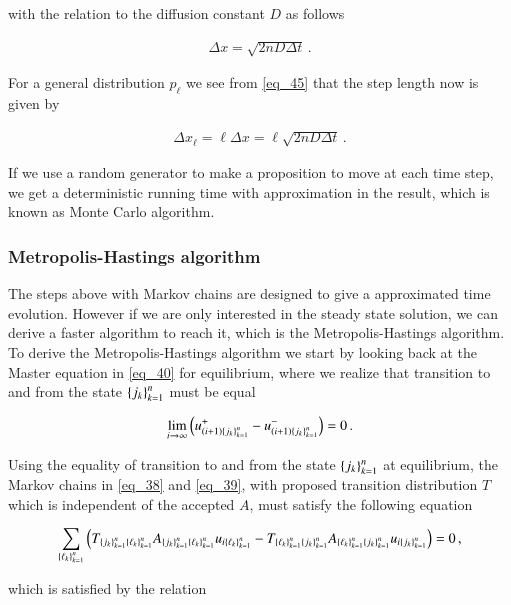 \documentclass[11pt,english,a4paper]{article}
\begin{document}
\begin{flushleft}
with the relation to the diffusion constant $D$ as follows

\begin{align}
\Delta x = \sqrt{2nD\Delta t}\,. 
\label{eq_46}
\end{align}

For a general distribution $p_\ell$ we see from \eqref{eq_45} that the step length now is given by

\begin{align}
\Delta x_\ell = \ell \Delta x = \ell\sqrt{2nD\Delta t}\,.
\label{eq_47}
\end{align} 

If we use a random generator to make a proposition to move at each time step, we get a deterministic running time with approximation in the result, which is known as Monte Carlo algorithm. 

\subsubsection{Metropolis-Hastings algorithm}

The steps above with Markov chains are designed to give a approximated time evolution. However if we are only interested in the steady state solution, we can derive a faster algorithm to reach it, which is the Metropolis-Hastings algorithm. To derive the Metropolis-Hastings algorithm we start by looking back at the Master equation in \eqref{eq_40} for equilibrium, where we realize that transition to and from the state $\left\lbrace{j_k}\right\rbrace_{k=1}^n$ must be equal

\begin{align*}
\lim_{i\to \infty} \left({u_{(i+1)\left\lbrace{j_k}\right\rbrace_{k=1}^n}^+ - u_{(i+1)\left\lbrace{j_k}\right\rbrace_{k=1}^n}^-}\right) = 0 \,.
\end{align*}

Using the equality of transition to and from the state $\left\lbrace{j_k}\right\rbrace_{k=1}^n$ at equilibrium,  the Markov chains in \eqref{eq_38} and \eqref{eq_39}, with proposed transition distribution $T$ which is independent of the accepted $A$, must satisfy the following equation

\begin{align*}
\sum_{\left\lbrace{\ell_k}\right\rbrace_{k=1}^n}\left({T_{\left\lbrace{j_k}\right\rbrace_{k=1}^n \left\lbrace{\ell_k}\right\rbrace_{k=1}^n}A_{\left\lbrace{j_k}\right\rbrace_{k=1}^n \left\lbrace{\ell_k}\right\rbrace_{k=1}^n} u_{i\left\lbrace{\ell_k}\right\rbrace_{k=1}^n} - T_{\left\lbrace{\ell_k}\right\rbrace_{k=1}^n \left\lbrace{j_k}\right\rbrace_{k=1}^n}A_{\left\lbrace{\ell_k}\right\rbrace_{k=1}^n \left\lbrace{j_k}\right\rbrace_{k=1}^n} u_{i\left\lbrace{j_k}\right\rbrace_{k=1}^n}}\right) = 0 \,,
\end{align*}


which is satisfied by the relation


\end{flushleft}
\end{document}
